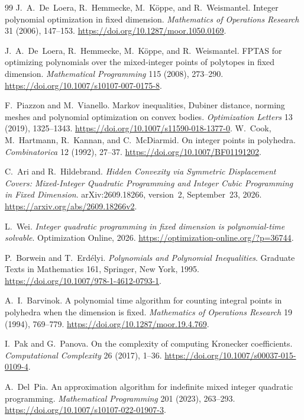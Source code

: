 \documentclass[final,5p,times,twocolumn]{elsarticle}
\theoremstyle{definition}\newtheorem{definition}{Definition}[section]
\theoremstyle{remark}\newtheorem{remark}[theorem]{Remark}
\begin{document}
\begin{thebibliography}{99}
 J.~A.~De~Loera, R.~Hemmecke, M.~K\"oppe, and R.~Weismantel.
Integer polynomial optimization in fixed dimension.
\emph{Mathematics of Operations Research} 31 (2006), 147--153.
\url{https://doi.org/10.1287/moor.1050.0169}.

 J.~A.~De~Loera, R.~Hemmecke, M.~K\"oppe, and R.~Weismantel.
FPTAS for optimizing polynomials over the mixed-integer points of polytopes in fixed dimension.
\emph{Mathematical Programming} 115 (2008), 273--290.
\url{https://doi.org/10.1007/s10107-007-0175-8}.

 F.~Piazzon and M.~Vianello.
Markov inequalities, Dubiner distance, norming meshes and polynomial optimization on convex bodies.
\emph{Optimization Letters} 13 (2019), 1325--1343.
\url{https://doi.org/10.1007/s11590-018-1377-0}.
 W.~Cook, M.~Hartmann, R.~Kannan, and C.~McDiarmid.
On integer points in polyhedra.
\emph{Combinatorica} 12 (1992), 27--37.
\url{https://doi.org/10.1007/BF01191202}.

 C.~Ari and R.~Hildebrand.
\emph{Hidden Convexity via Symmetric Displacement Covers: Mixed-Integer Quadratic Programming and Integer Cubic Programming in Fixed Dimension}.
arXiv:2609.18266, version~2, September~23, 2026.
\url{https://arxiv.org/abs/2609.18266v2}.

 L.~Wei.
\emph{Integer quadratic programming in fixed dimension is polynomial-time solvable}.
Optimization Online, 2026.
\url{https://optimization-online.org/?p=36744}.

 P.~Borwein and T.~Erd\'elyi.
\emph{Polynomials and Polynomial Inequalities}. Graduate Texts in Mathematics 161, Springer, New York, 1995.
\url{https://doi.org/10.1007/978-1-4612-0793-1}.

 A.~I.~Barvinok.
A polynomial time algorithm for counting integral points in polyhedra when the dimension is fixed.
\emph{Mathematics of Operations Research} 19 (1994), 769--779.
\url{https://doi.org/10.1287/moor.19.4.769}.

 I.~Pak and G.~Panova.
On the complexity of computing Kronecker coefficients.
\emph{Computational Complexity} 26 (2017), 1--36.
\url{https://doi.org/10.1007/s00037-015-0109-4}.

 A.~Del~Pia.
An approximation algorithm for indefinite mixed integer quadratic programming.
\emph{Mathematical Programming} 201 (2023), 263--293.
\url{https://doi.org/10.1007/s10107-022-01907-3}.


\end{thebibliography}
\end{document}

